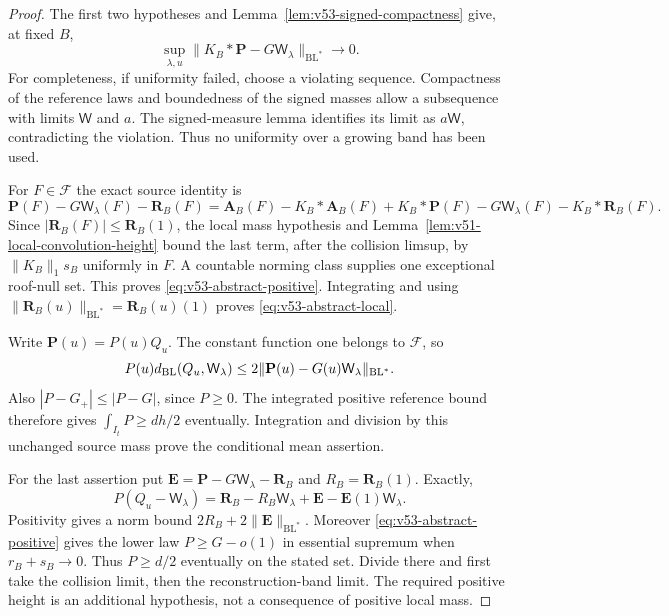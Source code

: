 \begin{proof}
The first two hypotheses and Lemma~\ref{lem:v53-signed-compactness}
give, at fixed $B$,
\[
 \sup_{\lambda,u}\|K_B*\mathbf P-G\mathsf W_\lambda
                                      \|_{\mathrm{BL}^*}\to0.
\]
For completeness, if uniformity failed, choose a violating sequence.
Compactness of the reference laws and boundedness of the signed
masses allow a subsequence with limits $\mathsf W$ and $a$.
The signed-measure lemma identifies its limit as $a\mathsf W$,
contradicting the violation. Thus no uniformity over a growing band
has been used.

For $F\in\mathcal F$ the exact source identity is
\[
 \mathbf P(F)-G\mathsf W_\lambda(F)-\mathbf R_B(F)
 =\mathbf A_B(F)-K_B*\mathbf A_B(F)
   +K_B*\mathbf P(F)-G\mathsf W_\lambda(F)-K_B*\mathbf R_B(F).
\]
Since $|\mathbf R_B(F)|\le\mathbf R_B(1)$, the local mass hypothesis
and Lemma~\ref{lem:v51-local-convolution-height} bound the last
term, after the collision limsup, by $\|K_B\|_1s_B$ uniformly in
$F$. A countable norming class supplies one exceptional roof-null
set. This proves \eqref{eq:v53-abstract-positive}. Integrating and
using $\|\mathbf R_B(u)\|_{\mathrm{BL}^*}=\mathbf R_B(u)(1)$
proves \eqref{eq:v53-abstract-local}.

Write $\mathbf P(u)=P(u)Q_u$. The constant function one belongs to
$\mathcal F$, so
\[
 P(u)d_{\rm BL}(Q_u,\mathsf W_\lambda)
       \le2\|\mathbf P(u)-G(u)\mathsf W_\lambda\|_{\mathrm{BL}^*}.
\]
Also $|P-G_+|\le|P-G|$, since $P\ge0$. The integrated positive
reference bound therefore gives $\int_{I_t}P\ge dh/2$ eventually.
Integration and division by this unchanged source mass prove the
conditional mean assertion.

For the last assertion put
$\mathbf E=\mathbf P-G\mathsf W_\lambda-\mathbf R_B$ and
$R_B=\mathbf R_B(1)$. Exactly,
\[
 P(Q_u-\mathsf W_\lambda)
   =\mathbf R_B-R_B\mathsf W_\lambda
                          +\mathbf E-\mathbf E(1)\mathsf W_\lambda.
\]
Positivity gives a norm bound $2R_B+2\|\mathbf E\|_{\mathrm{BL}^*}$.
Moreover \eqref{eq:v53-abstract-positive} gives the lower law
$P\ge G-o(1)$ in essential supremum when $r_B+s_B\to0$.
Thus $P\ge d/2$ eventually on the stated set. Divide there and
first take the collision limit, then the reconstruction-band limit.
The required positive height is an additional hypothesis, not a
consequence of positive local mass.
\end{proof}

